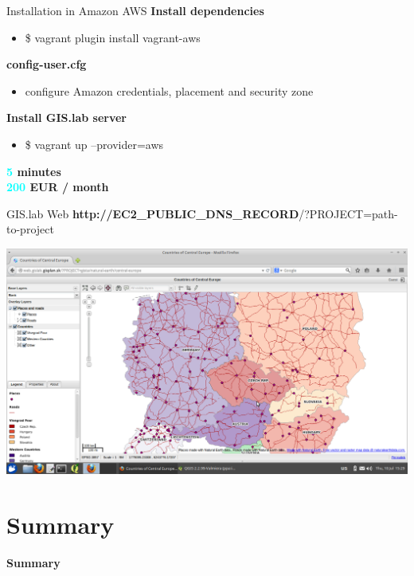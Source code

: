 \documentclass[12pt]{beamer}
\begin{document}
\begin{frame}{Installation in Amazon AWS}
	\textbf{Install dependencies}
	\begin{itemize}
		\item \$ vagrant plugin install vagrant-aws
	\end{itemize}

	\textbf{config-user.cfg}
	\begin{itemize}
		\item configure Amazon credentials, placement and security zone
	\end{itemize}

	\textbf{Install GIS.lab server}
	\begin{itemize}
		\item \$ vagrant up --provider=aws
	\end{itemize}
	
	\begin{flushleft}
		\textbf{\textcolor{Cyan}{5} minutes} \\
		\textbf{\textcolor{Cyan}{200} EUR / month} \\
	\end{flushleft}
\end{frame}


\begin{frame}{GIS.lab Web}
	\textbf{http://EC2_PUBLIC_DNS_RECORD}/?PROJECT=path-to-project
	\begin{center}
		\includegraphics[keepaspectratio=true,height=0.6\textheight]{images/rapid-gis-deployment/project-gislab-web-amazon-aws.png}
	\end{center}
\end{frame}


\section{Summary}
\begin{frame}
	\begin{center}
		\LARGE\textbf{Summary}
	\end{center}
\end{frame}
\end{document}
